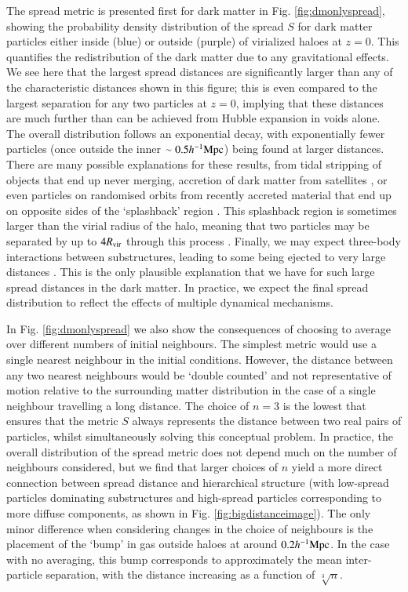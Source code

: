 The spread metric is presented first for dark matter in Fig.
\ref{fig:dmonlyspread}, showing the probability density distribution of the
spread $S$ for dark matter particles either inside (blue) or outside (purple)
of virialized haloes at $z=0$. This quantifies the redistribution of the dark
matter due to any gravitational effects. We see here that the largest spread
distances are significantly larger than any of the characteristic distances
shown in this figure; this is even compared to the largest separation for any
two particles at $z=0$, implying that these distances are much further than
can be achieved from Hubble expansion in voids alone. The overall
distribution follows an exponential decay, with exponentially fewer particles
(once outside the inner $\sim 0.5 h^{-1}{\rm Mpc}{}$) being found at larger distances.
There are many possible explanations for these results, from tidal stripping
of objects that end up never merging, accretion of dark matter from
satellites \citep[see e.g. the effects in ][]{VandenBosch2018}, or even
particles on randomised orbits from recently accreted material that end up on
opposite sides of the `splashback' region \citep{Diemer2014, Adhikari2014}.
This splashback region is sometimes larger than the virial radius of the
halo, meaning that two particles may be separated by up to $4R_{\rm vir}$
through this process \citep{Diemer2017a}. Finally, we may expect three-body
interactions between substructures, leading to some being ejected to very
large distances \citep[up to $6R_{\rm vir}$; see][]{Ludlow2009}. This is the
only plausible explanation that we have for such large spread distances in
the dark matter. In practice, we expect the final spread distribution to
reflect the effects of multiple dynamical mechanisms.

In Fig. \ref{fig:dmonlyspread} we also show the consequences of choosing to
average over different numbers of initial neighbours. The simplest metric
would use a single nearest neighbour in the initial conditions. However, the
distance between any two nearest neighbours would be ‘double counted’ and not
representative of motion relative to the surrounding matter distribution in
the case of a single neighbour travelling a long distance. The choice of
$n=3$ is the lowest that ensures that the metric $S$ always represents the
distance between two real pairs of particles, whilst simultaneously solving
this conceptual problem. In practice, the overall distribution of the spread
metric does not depend much on the number of neighbours considered, but we
find that larger choices of $n$ yield a more direct connection between spread
distance and hierarchical structure (with low-spread particles dominating
substructures and high-spread particles corresponding to more diffuse
components, as shown in Fig. \ref{fig:bigdistanceimage}). The only minor difference
when considering changes in the choice of neighbours is the placement of the
`bump' in gas outside haloes at around $0.2h^{-1}{\rm Mpc}{}$. In the case with no averaging,
this bump corresponds to approximately the mean inter-particle separation, with
the distance increasing as a function of $\sqrt[3]{n}$.

